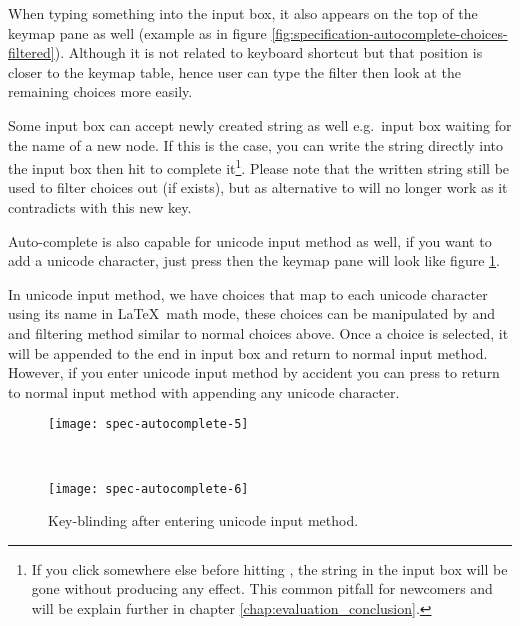 \documentclass[master.tex]{subfiles}
\begin{document}
When typing something into the input box, it also appears on the top of the
keymap pane as well (example as in figure
\ref{fig:specification-autocomplete-choices-filtered}). Although it is not
related to keyboard shortcut but that position is closer to the keymap table,
hence user can type the filter then look at the remaining choices more easily.

Some input box can accept newly created string as well e.g.\ input box waiting
for the name of a new node. If this is the case, you can write the string
directly into the input box then hit  to complete it\footnote{If
  you click somewhere else before hitting , the string in the
  input box will be gone without producing any effect. This common pitfall for
  newcomers and will be explain further in chapter
  \ref{chap:evaluation_conclusion}.}. Please note that the written string still
be used to filter choices out (if exists), but  as alternative to
 will no longer work as it contradicts with this new key.

Auto-complete is also capable for unicode input method as well, if you want to
add a unicode character, just press  then the keymap pane will look
like figure \ref{fig:specification-autocomplete-choices-unicode}.

In unicode input method, we have choices that map to each unicode character
using its name in \LaTeX\ math mode, these choices can be manipulated by
\pkbd{Alt-[} and \pkbd{Alt-]} and filtering method similar to normal choices
above. Once a choice is selected, it will be appended to the end in input box
and return to normal input method. However, if you enter unicode input method by
accident you can press  to return to normal input method with
appending any unicode character.

\begin{figure}[H]
    \centering

\begin{minipage}{0.35\textwidth}
\begin{flushleft}
    \texttt{[image: spec-autocomplete-5]}
\end{flushleft}
\end{minipage}
~
\begin{minipage}{0.35\textwidth}
\begin{flushright}
    \texttt{[image: spec-autocomplete-6]}
\end{flushright}
\end{minipage}
\caption{Key-blinding after entering unicode input method.}
\label{fig:specification-autocomplete-choices-unicode}
\end{figure}
\end{document}
